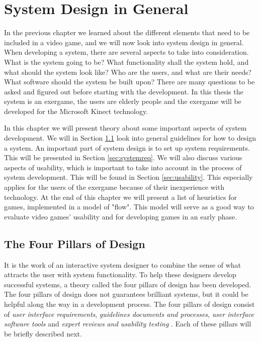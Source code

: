 \chapter{System Design in General}
\label{chap:generalsystemdesign}
In the previous chapter we learned about the different elements that need to be included in a video game, and we will now look into system design in general. When developing a system, there are several aspects to take into consideration. What is the system going to be? What functionality shall the system hold, and what should the system look like? Who are the users, and what are their needs? What software should the system be built upon? There are many questions to be asked and figured out before starting with the development. In this thesis the system is an exergame, the users are elderly people and the exergame will be developed for the Microsoft Kinect technology.

In this chapter we will present theory about some important aspects of system development. We will in Section \ref{sec:fourpillarsofdesign} look into general guidelines for how to design a system. An important part of system design is to set up system requirements. This will be presented in Section \ref{sec:systemreq}. We will also discuss various aspects of usability, which is important to take into account in the process of system development. This will be found in Section \ref{sec:usability}. This especially applies for the users of the exergame because of their inexperience with technology.  At the end of this chapter we will present a list of heuristics for games, implemented in a model of "flow". This model will serve as a good way to evaluate video games' usability and for developing games in an early phase.

\section{The Four Pillars of Design}
\label{sec:fourpillarsofdesign}
It is the work of an interactive system designer to combine the sense of what attracts the user with system functionality. To help these designers develop successful systems, a theory called the four pillars of design has been developed. The four pillars of design does not guarantees brilliant systems, but it could be helpful along the way in a development process. The four pillars of design consist of \emph{user interface requirements}, \emph{guidelines documents and processes}, \emph{user interface software tools} and \emph{expert reviews and usability testing} \cite{mmi}. Each of these pillars will be briefly described next. 

